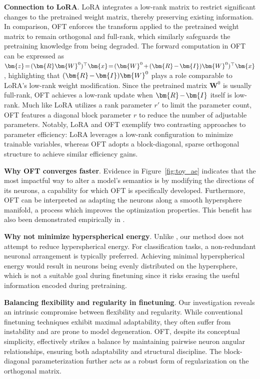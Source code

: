 {\textbf{Connection to LoRA}. LoRA integrates a low-rank matrix to restrict significant changes to the pretrained weight matrix, thereby preserving existing information. In comparison, OFT enforces the transform applied to the pretrained weight matrix to remain orthogonal and full-rank, which similarly safeguards the pretraining knowledge from being degraded. The forward computation in OFT can be expressed as $\thickmuskip=2mu \medmuskip=2mu \bm{z}=(\bm{R}\bm{W}^0)^\top\bm{x}=(\bm{W}^0+(\bm{R}-\bm{I})\bm{W}^0)^\top\bm{x}$, highlighting that $\thickmuskip=2mu \medmuskip=2mu (\bm{R}-\bm{I})\bm{W}^0$ plays a role comparable to LoRA’s low-rank weight modification. Since the pretrained matrix $\bm{W}^0$ is usually full-rank, OFT achieves a low-rank update when $\thickmuskip=2mu \medmuskip=2mu \bm{R}-\bm{I}$ itself is low-rank. Much like LoRA utilizes a rank parameter $r'$ to limit the parameter count, OFT features a diagonal block parameter $r$ to reduce the number of adjustable parameters. Notably, LoRA and OFT exemplify two contrasting approaches to parameter efficiency: LoRA leverages a low-rank configuration to minimize trainable variables, whereas OFT adopts a block-diagonal, sparse orthogonal structure to achieve similar efficiency gains.

\textbf{Why OFT converges faster}. Evidence in Figure~\ref{fig:toy_ae} indicates that the most impactful way to alter a model's semantics is by modifying the directions of its neurons, a capability for which OFT is specifically developed. Furthermore, OFT can be interpreted as adapting the neurons along a smooth hypersphere manifold, a process which improves the optimization properties. This benefit has also been demonstrated empirically in \cite{liu2021orthogonal}.

\textbf{Why not minimize hyperspherical energy}. Unlike \cite{liu2021orthogonal}, our method does not attempt to reduce hyperspherical energy. For classification tasks, a non-redundant neuronal arrangement is typically preferred. Achieving minimal hyperspherical energy would result in neurons being evenly distributed on the hypersphere, which is not a suitable goal during finetuning since it risks erasing the useful information encoded during pretraining.

\textbf{Balancing flexibility and regularity in finetuning}. Our investigation reveals an intrinsic compromise between flexibility and regularity. While conventional finetuning techniques exhibit maximal adaptability, they often suffer from instability and are prone to model degeneration. OFT, despite its conceptual simplicity, effectively strikes a balance by maintaining pairwise neuron angular relationships, ensuring both adaptability and structural discipline. The block-diagonal parameterization further acts as a robust form of regularization on the orthogonal matrix.

}
